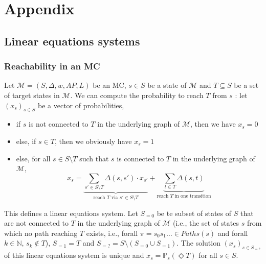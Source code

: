 \chapter*{Appendix}
\renewcommand{\thechapter}{\Alph{chapter}}
\setcounter{chapter}{1}

\section{Linear equations systems}
\subsection{Reachability in an MC}\label{app-reach}
Let $\mathcal{M} = (S, \Delta, w, AP, L)$ be an MC, $s \in S$ be a state of $\mathcal{M}$ and $T \subseteq S$ be a set of target states in $\mathcal{M}$.
We can compute the probability to reach $T$ from $s$ :
let $(x_s)_{s \in S}$ be a vector of probabilities,
\begin{itemize}
	\item if $s$ is not connected to $T$ in the underlying graph of $\mathcal{M}$, then we have $x_s = 0$
	\item else, if $s \in T$, then we obviously have $x_s = 1$
	\item else, for all $s \in S \setminus T$  such that $s$ is connected to $T$ in the underlying graph of $\mathcal{M}$,
		\[
      x_s = \underbrace{\sum_{s' \in S \setminus T} \Delta(s, s') \cdot x_{s'}}_{\text{reach $T$ via $s' \in S \setminus T$}} + \underbrace{\sum_{t \in T} \Delta(s, t)}_{\text{reach $T$ in one transition}}
    \]
\end{itemize}
This defines a linear equations system.
Let $S_{=0}$ be te subset of states of $S$ that are not connected to $T$ in the underlying graph of $\mathcal{M}$ (i.e., the set of states $s$ from which no path reaching $T$ exists, i.e., forall $\pi = s_0s_1\dots \in Paths(s)$ and forall $k \in \mathbb{N}$, $s_k \not\in T$), $S_{=1} = T$ and $S_{=?} = S \setminus (S_{=0} \cup S_{=1})$.
The solution $(x_s)_{s \in S_{=?}}$ of this linear equations system is unique and $x_s = \mathbb{P}_s(\Diamond T)$ for all $s \in S$.

